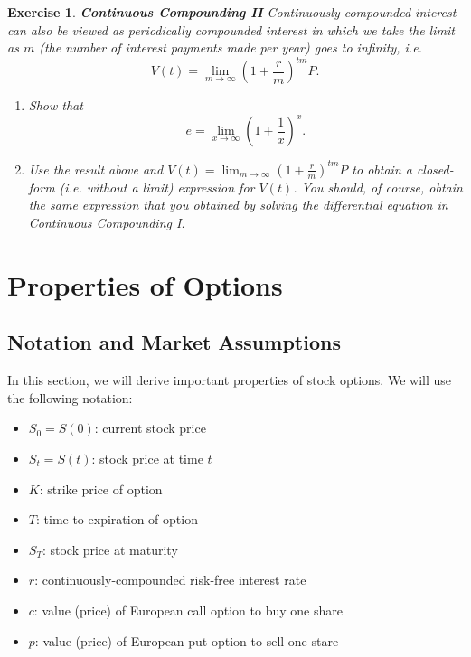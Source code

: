 \documentclass[letterpaper,10pt]{article}
\newtheorem{ex}{Exercise}
\begin{document}
\begin{ex}{\bf Continuous Compounding II}
Continuously compounded interest can also be viewed as periodically compounded interest in which we take the {\em limit} as $m$ (the number of interest payments made per year) goes to infinity, i.e. $$V(t)=\lim_{m\rightarrow\infty}\left(1+\frac{r}{m}\right)^{tm}P.$$
\begin{enumerate}
\item[(a)] Show that $$e=\lim_{x\rightarrow\infty}\left(1+\frac{1}{x}\right)^x.$$  

\item[(b)] Use the result above and $V(t)=\displaystyle \lim_{m\rightarrow\infty}\left(1+\frac{r}{m}\right)^{tm}P$ to obtain a closed-form (i.e. without a limit) expression for $V(t)$.  You should, of course, obtain the same expression that you obtained by solving the differential equation in Continuous Compounding I.
\end{enumerate}
\end{ex}


\newpage

\section{Properties of Options}

\subsection{Notation and Market Assumptions}

In this section, we will derive important properties of stock options.  We will use the following notation:

\begin{itemize}

\item $S_0=S(0)$:  current stock price

\item $S_t=S(t)$: stock price at time $t$ 

\item $K$: strike price of option

\item $T$:  time to expiration of option

\item $S_T$:  stock price at maturity

\item $r$:  continuously-compounded risk-free interest rate

\item $c$:  value (price) of European call option to buy one share

\item $p$:  value (price) of European put option to sell one stare

\end{itemize}
\end{document}
